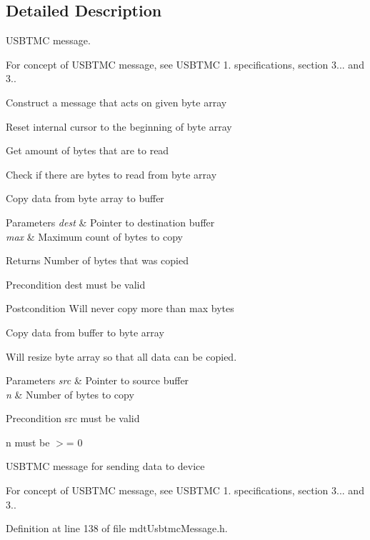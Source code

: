 \subsection{Detailed Description}
U\-S\-B\-T\-M\-C message. 

For concept of U\-S\-B\-T\-M\-C message, see U\-S\-B\-T\-M\-C 1. specifications, section 3... and 3..

Construct a message that acts on given byte array

Reset internal cursor to the beginning of byte array

Get amount of bytes that are to read

Check if there are bytes to read from byte array

Copy data from byte array to buffer


\begin{DoxyParams}{Parameters}
{\em dest} & Pointer to destination buffer \\
\hline
{\em max} & Maximum count of bytes to copy \\
\hline
\end{DoxyParams}
\begin{DoxyReturn}{Returns}
Number of bytes that was copied 
\end{DoxyReturn}
\begin{DoxyPrecond}{Precondition}
dest must be valid 
\end{DoxyPrecond}
\begin{DoxyPostcond}{Postcondition}
Will never copy more than max bytes
\end{DoxyPostcond}
Copy data from buffer to byte array

Will resize byte array so that all data can be copied.


\begin{DoxyParams}{Parameters}
{\em src} & Pointer to source buffer \\
\hline
{\em n} & Number of bytes to copy \\
\hline
\end{DoxyParams}
\begin{DoxyPrecond}{Precondition}
src must be valid 

n must be $>$= 0
\end{DoxyPrecond}
U\-S\-B\-T\-M\-C message for sending data to device

For concept of U\-S\-B\-T\-M\-C message, see U\-S\-B\-T\-M\-C 1. specifications, section 3... and 3.. 

Definition at line 138 of file mdt\-Usbtmc\-Message.\-h.



